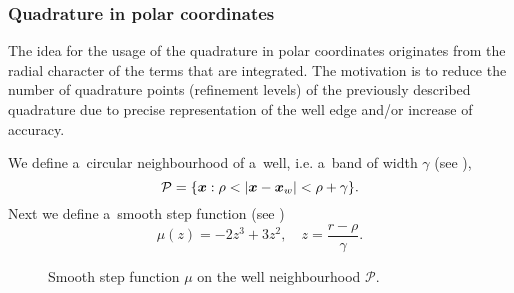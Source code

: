 \subsubsection{Quadrature in polar coordinates}

The idea for the usage of the quadrature in polar coordinates originates from the radial character of the terms
that are integrated. 
The motivation is to reduce the number of quadrature points (refinement levels) of the previously described quadrature due to
precise representation of the well edge and/or increase of accuracy.

We define a~circular neighbourhood of a~well, i.e. a~band of width $\gamma$ (see ),
\[ \mathcal{P} = \{\mathbf{\boldsymbol{x}}: \rho < \left|\mathbf{\boldsymbol{x}} - \mathbf{\boldsymbol{x}}_w\right| < \rho + \gamma \}.\]
Next we define a~smooth step function (see )
\[\mu(z) = -2 z^3 +3 z^2,\quad z=\frac{r-\rho}{\gamma}.\]%
%
\begin{figure}[!htb]
  \vspace{-35pt}
  \centering    
  \hspace{0pt}
  \caption[Smooth step function]
  {Smooth step function $\mu$ on the well neighbourhood $\mathcal{P}$.
  }
  \label{fig:smooth_step_well_band}
\end{figure}    

